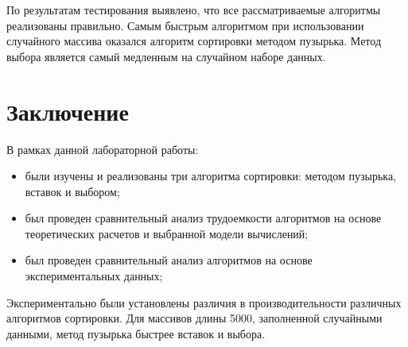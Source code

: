 \documentclass[a4paper,14pt, unknownkeysallowed]{extreport}
\begin{document}
    По результатам тестирования выявлено, что все рассматриваемые алгоритмы реализованы правильно. Самым быстрым алгоритмом при использовании случайного массива оказался алгоритм сортировки методом пузырька. Метод выбора является самый медленным на случайном наборе данных.

    \chapter*{Заключение}

    В рамках данной лабораторной работы:

    \begin{itemize}
        \item были изучены и реализованы три алгоритма сортировки: методом пузырька, вставок и выбором;
        \item был проведен сравнительный анализ трудоемкости алгоритмов на основе теоретических расчетов и выбранной модели вычислений;
        \item был проведен сравнительный анализ алгоритмов на основе экспериментальных данных;
    \end{itemize}

    Экспериментально были установлены различия в производительности различных алгоритмов сортировки. Для массивов длины 5000, заполненной случайными данными, метод пузырька быстрее вставок и выбора.
\end{document}
